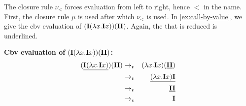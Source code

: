 The closure rule $\nu_<$ forces evaluation from left to right, hence $<$ in the name. 
First, the closure rule $\mu$ is used after which $\nu_<$ is used. 
In \cref{ex:call-by-value}, we give the \textsf{cbv} evaluation of \lterm $(\mathbf{I}(\lambda {x}.{\mathbf{I} x}))(\mathbf{I} \mathbf{I})$.
Again, the \bre that is reduced is underlined.

\begin{example}
  \label{ex:call-by-value}
  \textbf{\textsf{Cbv} evaluation of $(\mathbf{I}(\lambda {x}.{\mathbf{I} x}))(\mathbf{I} \mathbf{I})$:}
  \begin{eqnarray*}
 (\underline{\mathbf{I}(\lambda {x}.{\mathbf{I} x})})(\mathbf{I} \mathbf{I}) &\to_v& (\lambda {x}.{\mathbf{I} x}) (\underline{\mathbf{I} \mathbf{I}}) \\
    &\to_v& \underline{(\lambda {x}.{\mathbf{I} x}) \mathbf{I}} \\
    &\to_v& \underline{\mathbf{I} \mathbf{I}} \\
    &\to_v& \mathbf{I} 
  \end{eqnarray*}
\end{example}

